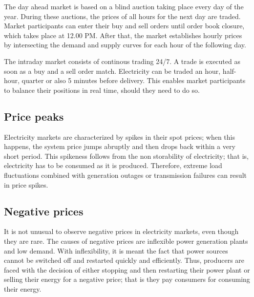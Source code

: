 The day ahead market is based on a blind auction taking place every day of the year.
During these auctions, the prices of all hours for the next day are traded.
Market participants can enter their buy and sell orders until order book closure, which takes place at 12.00 PM. After that, the market establishes hourly prices by intersecting the demand and supply curves for each hour of the following day.

The intraday market consists of continous trading 24/7. A trade is executed as soon as a buy and a sell order match. Electricity can be traded an hour, half-hour, quarter or also 5 minutes before delivery. This enables market participants to balance their positions in real time, should they need to do so.

\subsection{Price peaks}
Electricity markets are characterized by spikes in their spot prices; when this happens, the system price jumps abruptly and then drops back within a very short period.
This spikeness follows from the non storability of electricity; that is, electricity has to be consumed as it is produced. Therefore, extreme load fluctuations combined with generation outages or transmission failures can result in price spikes.

\subsection{Negative prices}
It is not unusual to observe negative prices in electricity markets, even though they are rare.
The causes of negative prices are inflexible power generation plants and low demand. With inflexibility, it is meant the fact that power sources cannot be switched off and restarted quickly and efficiently.
Thus, producers are faced with the decision of either stopping and then restarting their power plant or selling their energy for a negative price; that is they pay consumers for consuming their energy.

